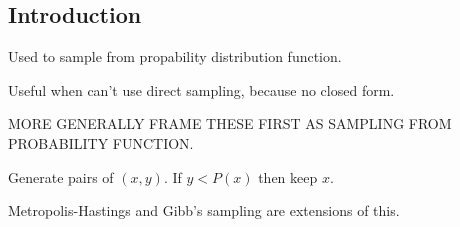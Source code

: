 
\subsection{Introduction}

Used to sample from propability distribution function.

Useful when can't use direct sampling, because no closed form.

MORE GENERALLY FRAME THESE FIRST AS SAMPLING FROM PROBABILITY FUNCTION.

Generate pairs of \((x, y)\). If \(y<P(x)\) then keep \(x\).


Metropolis-Hastings and Gibb's sampling are extensions of this.

